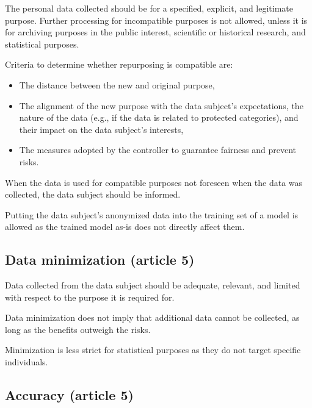 The personal data collected should be for a specified, explicit, and legitimate purpose. Further processing for incompatible purposes is not allowed, unless it is for archiving purposes in the public interest, scientific or historical research, and statistical purposes.

Criteria to determine whether repurposing is compatible are:
\begin{itemize}
    \item The distance between the new and original purpose,
    \item The alignment of the new purpose with the data subject's expectations, the nature of the data (e.g., if the data is related to protected categories), and their impact on the data subject's interests,
    \item The measures adopted by the controller to guarantee fairness and prevent risks.
\end{itemize}

\begin{remark}
    When the data is used for compatible purposes not foreseen when the data was collected, the data subject should be informed.
\end{remark}

\begin{remark}
    Putting the data subject's anonymized data into the training set of a model is allowed as the trained model as-is does not directly affect them.
\end{remark} 


\subsection{Data minimization (article 5)} 

Data collected from the data subject should be adequate, relevant, and limited with respect to the purpose it is required for.

\begin{remark}
    Data minimization does not imply that additional data cannot be collected, as long as the benefits outweigh the risks.
\end{remark}

\begin{remark}
    Minimization is less strict for statistical purposes as they do not target specific individuals.
\end{remark} 


\subsection{Accuracy (article 5)} 

